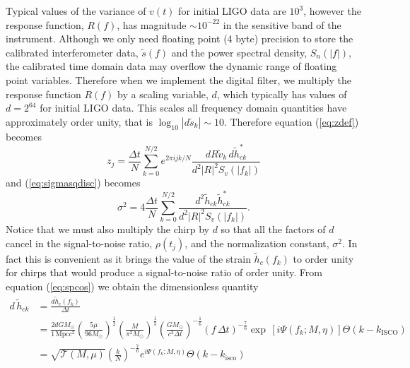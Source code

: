 Typical values of the variance of $v(t)$ for initial LIGO data are $10^3$,
however the response function, $R(f)$, has magnitude $\sim 10^{-22}$ in the
sensitive band of the instrument. Although we only need floating point (4
byte) precision to store the calibrated interferometer data, $\tilde{s}(f)$
and the power spectral density, $S_n(|f|)$, the calibrated time domain data may
overflow the dynamic range of floating point variables. Therefore when we
implement the digital filter, we multiply the response function $R(f)$ by a
scaling variable, $d$, which typically has values of $d = 2^{64}$ for initial
LIGO data. This scales all frequency domain quantities have approximately
order unity, that is $\log_{10}|d\tilde{s}_{k}| \sim 10$.  Therefore equation
(\ref{eq:zdef}) becomes
\begin{equation}
\label{eq:zdefcal}
z_j = \frac{\Delta t}{N} \sum_{k=0}^{N/2} e^{2\pi ijk/N} 
  \frac{dR\tilde{v}_k\, d\tilde{h}_{ck}^\ast}
  {d^2|R|^2S_v\left(\left|f_k\right|\right)}
\end{equation}
and (\ref{eq:sigmasqdisc}) becomes
\begin{equation}
\label{eq:sigmasqdisccal}
\sigma^2 = 4 \frac{\Delta t}{N} \sum_{k=0}^{N/2}
\frac{d^2 \tilde{h}_{ck}\tilde{h}_{ck}^\ast}
{d^2|R|^2S_v\left(\left|f_k\right|\right)}. 
\end{equation}
Notice that we must also multiply the chirp by $d$ so that all the factors of
$d$ cancel in the signal-to-noise ratio, $\rho(t_j)$, and the normalization
constant, $\sigma^2$. In fact this is convenient as it brings the value of
the strain $\tilde{h}_c(f_k)$ to order unity for chirps that would produce a
signal-to-noise ratio of order unity. From equation (\ref{eq:spcos}) we obtain
the dimensionless quantity
\begin{equation}
\begin{split}
\label{eq:hck}
d\,\tilde{h}_{ck} &= \frac{d \tilde{h}_c(f_k)}{\Delta t} \\
&= 
\frac{2dGM_\odot}{1\,\mathrm{Mpc} c^2}
\left(\frac{5\mu}{96M_\odot}\right)^\frac{1}{2}
\left(\frac{M}{\pi^2M_\odot}\right)^\frac{1}{3}
\left(\frac{GM_\odot}{c^3\Delta t}\right)^{-\frac{1}{6}}
\left( f\,\Delta t \right)^{-\frac{7}{6}}
\exp\,[i\Psi(f_k;M,\eta)] \Theta\left(k-k_\mathrm{ISCO}\right)\\
&=
\sqrt{\mathcal{T}(M,\mu)}\left(\frac{k}{N}\right)^{-\frac{7}{6}}
e^{i\Psi\left(f_k;M,\eta\right)} \Theta\left(k-k_\mathrm{isco}\right)
\end{split}
\end{equation}
